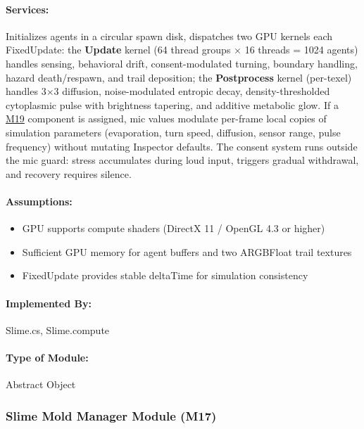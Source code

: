 \documentclass[12pt, titlepage]{article}
\begin{document}
\paragraph{Services:}
Initializes agents in a circular spawn disk, dispatches two GPU kernels each FixedUpdate:
the \textbf{Update} kernel (64 thread groups $\times$ 16 threads = 1024 agents) handles sensing,
behavioral drift, consent-modulated turning, boundary handling, hazard death/respawn, and trail
deposition; the \textbf{Postprocess} kernel (per-texel) handles 3$\times$3 diffusion, noise-modulated
entropic decay, density-thresholded cytoplasmic pulse with brightness tapering, and additive
metabolic glow. If a \hyperref[M19]{M19} component is assigned, mic values modulate per-frame
local copies of simulation parameters (evaporation, turn speed, diffusion, sensor range, pulse
frequency) without mutating Inspector defaults. The consent system runs outside the mic guard:
stress accumulates during loud input, triggers gradual withdrawal, and recovery requires silence.

\paragraph{Assumptions:}
\begin{itemize}
\item GPU supports compute shaders (DirectX 11 / OpenGL 4.3 or higher)
\item Sufficient GPU memory for agent buffers and two ARGBFloat trail textures
\item FixedUpdate provides stable deltaTime for simulation consistency
\end{itemize}

\paragraph{Implemented By:}
Slime.cs, Slime.compute

\paragraph{Type of Module:}
Abstract Object

\vspace{10mm}

\subsubsection{Slime Mold Manager Module (M17)} \label{M17}
\end{document}
